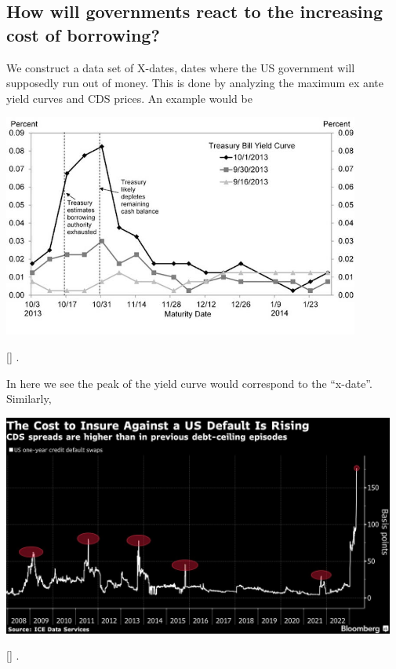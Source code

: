 \documentclass[
  12pt]{article}
\begin{document}
\hypertarget{how-will-governments-react-to-the-increasing-cost-of-borrowing}{%
\subsection{How will governments react to the increasing cost of
borrowing?}\label{how-will-governments-react-to-the-increasing-cost-of-borrowing}}

We construct a data set of X-dates, dates where the US government will
supposedly run out of money. This is done by analyzing the maximum ex
ante yield curves and CDS prices. An example would be

\includegraphics[width=4.625in,height=\textheight]{style-guide/x-date-estmation.jpg}

{[}\citet{boesler}{]}\citep{steinmetz-silber} .

In here we see the peak of the yield curve would correspond to the
``x-date''. Similarly,

\includegraphics[width=5.09375in,height=\textheight]{style-guide/CDS-x-date.png}

{[}\citet{rao2023}{]}\citep{benzoni} .
\end{document}
